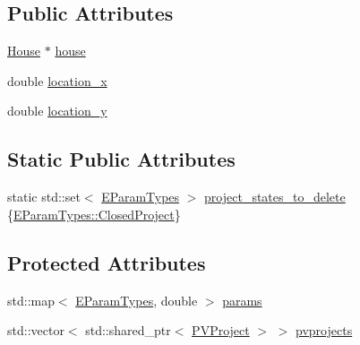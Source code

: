 \subsection*{Public Attributes}
\begin{DoxyCompactItemize}
\item 
\hyperlink{classsolar__core_1_1_house}{House} $\ast$ \hyperlink{classsolar__core_1_1_household_a1104d8264fe733937e1fd2e9ad0f8fc1}{house}
\end{DoxyCompactItemize}
{\bf }\par
\begin{DoxyCompactItemize}
\item 
double \hyperlink{classsolar__core_1_1_household_a6596375631a366fdd24270f75548841f}{location\+\_\+x}
\item 
double \hyperlink{classsolar__core_1_1_household_a1ba6b7af82982096e05d99a70a2647eb}{location\+\_\+y}
\end{DoxyCompactItemize}

\subsection*{Static Public Attributes}
{\bf }\par
\begin{DoxyCompactItemize}
\item 
static std\+::set$<$ \hyperlink{namespacesolar__core_aa1147341e5ef7a40d68d1bd68e149362}{E\+Param\+Types} $>$ \hyperlink{classsolar__core_1_1_household_ad7ec15745665433a5f9f174e8618bdc7}{project\+\_\+states\+\_\+to\+\_\+delete} \{\hyperlink{namespacesolar__core_aa1147341e5ef7a40d68d1bd68e149362a36011ab25e125345f76caf5e8f027175}{E\+Param\+Types\+::\+Closed\+Project}\}
\end{DoxyCompactItemize}

\subsection*{Protected Attributes}
{\bf }\par
\begin{DoxyCompactItemize}
\item 
std\+::map$<$ \hyperlink{namespacesolar__core_aa1147341e5ef7a40d68d1bd68e149362}{E\+Param\+Types}, double $>$ \hyperlink{classsolar__core_1_1_household_a41d61dc3bab971cb19170341b77d9df8}{params}
\end{DoxyCompactItemize}

{\bf }\par
\begin{DoxyCompactItemize}
\item 
std\+::vector$<$ std\+::shared\+\_\+ptr$<$ \hyperlink{classsolar__core_1_1_p_v_project}{P\+V\+Project} $>$ $>$ \hyperlink{classsolar__core_1_1_household_a79c0e955af98669487e0fb472811f842}{pvprojects}
\end{DoxyCompactItemize}

